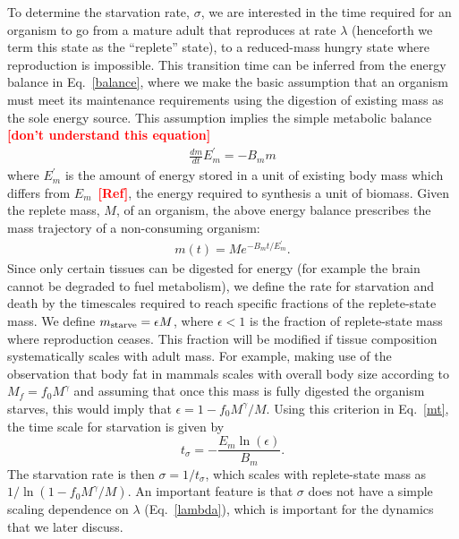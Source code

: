 \documentclass{pnastwo}
\newcommand{\sid}[1]{\textcolor{red}{\bf [#1]}}
\begin{document}
\begin{article}
To determine the starvation rate, $\sigma$, we are interested in the time
required for an organism to go from a mature adult that reproduces at rate
$\lambda$ (henceforth we term this state as the ``replete'' state), to a
reduced-mass hungry state where reproduction is impossible.  This transition
time can be inferred from the energy balance in Eq.~\ref{balance}, where we
make the basic assumption that an organism must meet its maintenance
requirements using the digestion of existing mass as the sole energy source.
This assumption implies the simple metabolic balance \sid{don't understand
  this equation}
\begin{eqnarray}
\frac{dm}{dt}E_{m}^{\prime}=-B_{m}m
\end{eqnarray}
where $E_{m}^{\prime}$ is the amount of energy stored in a unit of existing
body mass which differs from $E_{m}$~\cite{}\sid{Ref}, the energy required to
synthesis a unit of biomass. Given the replete mass, $M$, of an organism, the
above energy balance prescribes the mass trajectory of a non-consuming
organism:
\begin{eqnarray}
\label{mt}
m\left(t\right)=Me^{-B_{m}t/E_{m}^{\prime}}.
\end{eqnarray}
Since only certain tissues can be digested for energy (for example the brain
cannot be degraded to fuel metabolism), we define the rate for starvation and
death by the timescales required to reach specific fractions of the
replete-state mass.  We define $m_{\rm starve}=\epsilon M$, where
$\epsilon<1$ is the fraction of replete-state mass where reproduction ceases.
This fraction will be modified if tissue composition systematically scales
with adult mass.  For example, making use of the observation that body fat in
mammals scales with overall body size according to $M_{f}=f_{0}M^{\gamma}$
and assuming that once this mass is fully digested the organism starves, this
would imply that $\epsilon=1-f_{0}M^{\gamma}/M$.  Using this criterion in
Eq.~\ref{mt}, the time scale for starvation is given by
\begin{equation}
\label{eq:sigma}
t_{\sigma}=-\frac{E_{m}\ln\left(\epsilon\right)}{B_{m}}.
\end{equation}
The starvation rate is then $\sigma=1/t_{\sigma}$, which scales with
replete-state mass as $1/\ln\left(1-f_{0}M^{\gamma}/M\right)$.  An important
feature is that $\sigma$ does not have a simple scaling dependence on
$\lambda$ (Eq.~\ref{lambda}), which is important for the dynamics that we
later discuss.


\end{article}
\end{document}
